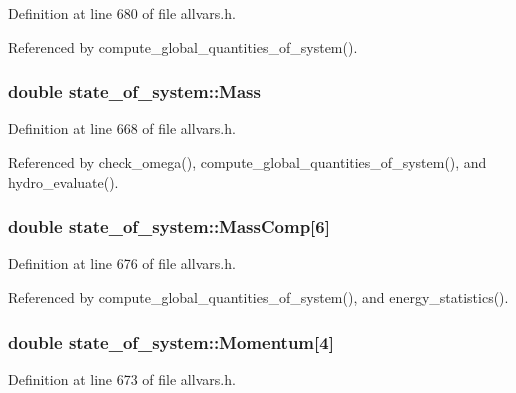 Definition at line 680 of file allvars.h.



Referenced by compute\_\-global\_\-quantities\_\-of\_\-system().

\hypertarget{structstate__of__system_a8a3263df2542de95325b0684814dab52}{
\subsubsection[{Mass}]{\setlength{\rightskip}{0pt plus 5cm}double {\bf state\_\-of\_\-system::Mass}}}
\label{structstate__of__system_a8a3263df2542de95325b0684814dab52}


Definition at line 668 of file allvars.h.



Referenced by check\_\-omega(), compute\_\-global\_\-quantities\_\-of\_\-system(), and hydro\_\-evaluate().

\hypertarget{structstate__of__system_a760dbd458028ff092d8fab04f54f90ff}{
\subsubsection[{MassComp}]{\setlength{\rightskip}{0pt plus 5cm}double {\bf state\_\-of\_\-system::MassComp}\mbox{[}6\mbox{]}}}
\label{structstate__of__system_a760dbd458028ff092d8fab04f54f90ff}


Definition at line 676 of file allvars.h.



Referenced by compute\_\-global\_\-quantities\_\-of\_\-system(), and energy\_\-statistics().

\hypertarget{structstate__of__system_a052f3f69811197adc33ecb8c4c1f8d6e}{
\subsubsection[{Momentum}]{\setlength{\rightskip}{0pt plus 5cm}double {\bf state\_\-of\_\-system::Momentum}\mbox{[}4\mbox{]}}}
\label{structstate__of__system_a052f3f69811197adc33ecb8c4c1f8d6e}


Definition at line 673 of file allvars.h.



